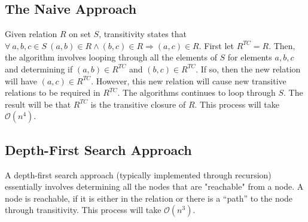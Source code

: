 \subsection{The Naive Approach}
Given relation \(R\) on set \(S\), transitivity states that \(\forall\:a,b,c\in S\:(a,b)\in R\land (b,c)\in R\Rightarrow(a,c)\in R\). First let \(R^{TC}=R\).
Then, the algorithm involves looping through all the elements of \(S\) for elements \(a,b,c\) and determining if \((a,b)\in R^{TC}\) and \((b,c)\in R^{TC}\). 
If so, then the new relation will have \((a,c)\in R^{TC}\). However, this new relation will cause new transitive relations to be required in \(R^{TC}\). 
The algorithms continues to loop through \(S\). The result will be that \(R^{TC}\) is the transitive closure of \(R\). This process will take \(\mathcal{O}(n^4)\).

\subsection{Depth-First Search Approach}
A depth-first search approach (typically implemented through recursion) essentially involves determining all the nodes that are "reachable" from a node. A node
is reachable, if it is either in the relation or there is a ``path'' to the node through transitivity. This process will take \(\mathcal{O}(n^3)\).

